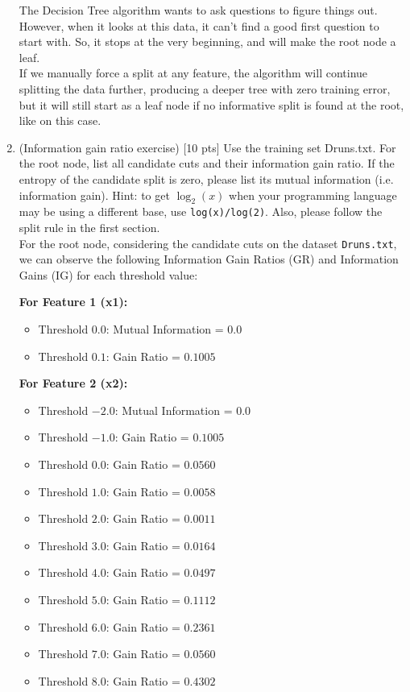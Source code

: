 \documentclass[a4paper]{article}
\theoremstyle{definition}
\begin{document}
\begin{enumerate}
The Decision Tree algorithm wants to ask questions to figure things out. However, when it looks at this data, it can't find a good first question to start with. So, it stops at the very beginning, and will make the root node a leaf.\\

If we manually force a split at any feature, the algorithm will continue splitting the data further, producing a deeper tree with zero training error, but it will still start as a leaf node if no informative split is found at the root, like on this case.\\

\item (Information gain ratio exercise)  [10 pts] Use the training set Druns.txt.  For the root node, list all candidate cuts and their information gain ratio. If the entropy of the candidate split is zero, please list its mutual information (i.e. information gain). Hint: to get $\log_2(x)$ when your programming language may be using a different base, use \verb|log(x)/log(2)|. Also, please follow the split rule in the first section. \\

For the root node, considering the candidate cuts on the dataset \texttt{Druns.txt}, we can observe the following Information Gain Ratios (GR) and Information Gains (IG) for each threshold value:

\textbf{For Feature 1 (x1):}
\begin{itemize}
    \item Threshold \(0.0\): Mutual Information = \(0.0\)
    \item Threshold \(0.1\): Gain Ratio = \(0.1005\)
\end{itemize}

\textbf{For Feature 2 (x2):}
\begin{itemize}
    \item Threshold \(-2.0\): Mutual Information = \(0.0\)
    \item Threshold \(-1.0\): Gain Ratio = \(0.1005\)
    \item Threshold \(0.0\): Gain Ratio = \(0.0560\)
    \item Threshold \(1.0\): Gain Ratio = \(0.0058\)
    \item Threshold \(2.0\): Gain Ratio = \(0.0011\)
    \item Threshold \(3.0\): Gain Ratio = \(0.0164\)
    \item Threshold \(4.0\): Gain Ratio = \(0.0497\)
    \item Threshold \(5.0\): Gain Ratio = \(0.1112\)
    \item Threshold \(6.0\): Gain Ratio = \(0.2361\)
    \item Threshold \(7.0\): Gain Ratio = \(0.0560\)
    \item Threshold \(8.0\): Gain Ratio = \(0.4302\)
\end{itemize}


\end{enumerate}
\end{document}
